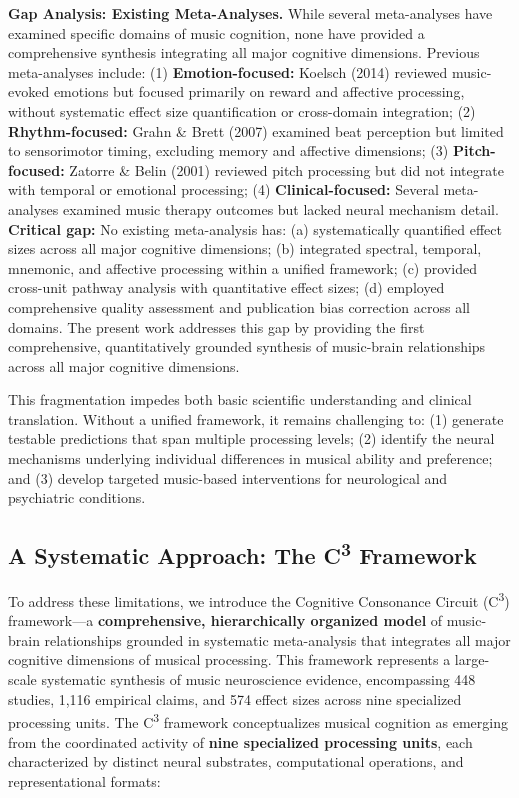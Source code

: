 \documentclass[9pt,onecolumn]{article}
\newcommand{\Cthree}{C\textsuperscript{3}}
\begin{document}
\textbf{Gap Analysis: Existing Meta-Analyses.} While several meta-analyses have examined specific domains of music cognition, none have provided a comprehensive synthesis integrating all major cognitive dimensions. Previous meta-analyses include: (1) \textbf{Emotion-focused:} Koelsch (2014) reviewed music-evoked emotions but focused primarily on reward and affective processing, without systematic effect size quantification or cross-domain integration; (2) \textbf{Rhythm-focused:} Grahn \& Brett (2007) examined beat perception but limited to sensorimotor timing, excluding memory and affective dimensions; (3) \textbf{Pitch-focused:} Zatorre \& Belin (2001) reviewed pitch processing but did not integrate with temporal or emotional processing; (4) \textbf{Clinical-focused:} Several meta-analyses examined music therapy outcomes but lacked neural mechanism detail. \textbf{Critical gap:} No existing meta-analysis has: (a) systematically quantified effect sizes across all major cognitive dimensions; (b) integrated spectral, temporal, mnemonic, and affective processing within a unified framework; (c) provided cross-unit pathway analysis with quantitative effect sizes; (d) employed comprehensive quality assessment and publication bias correction across all domains. The present work addresses this gap by providing the first comprehensive, quantitatively grounded synthesis of music-brain relationships across all major cognitive dimensions.

This fragmentation impedes both basic scientific understanding and clinical translation. Without a unified framework, it remains challenging to: (1) generate testable predictions that span multiple processing levels; (2) identify the neural mechanisms underlying individual differences in musical ability and preference; and (3) develop targeted music-based interventions for neurological and psychiatric conditions.


\vspace{-0.3em}
\subsection{A Systematic Approach: The \Cthree{} Framework}
\vspace{-0.2em}

To address these limitations, we introduce the Cognitive Consonance Circuit (\Cthree{}) framework---a \textbf{comprehensive, hierarchically organized model} of music-brain relationships grounded in systematic meta-analysis that integrates all major cognitive dimensions of musical processing. This framework represents a large-scale systematic synthesis of music neuroscience evidence, encompassing 448 studies, 1,116 empirical claims, and 574 effect sizes across nine specialized processing units. The \Cthree{} framework conceptualizes musical cognition as emerging from the coordinated activity of \textbf{nine specialized processing units}, each characterized by distinct neural substrates, computational operations, and representational formats:
\end{document}
